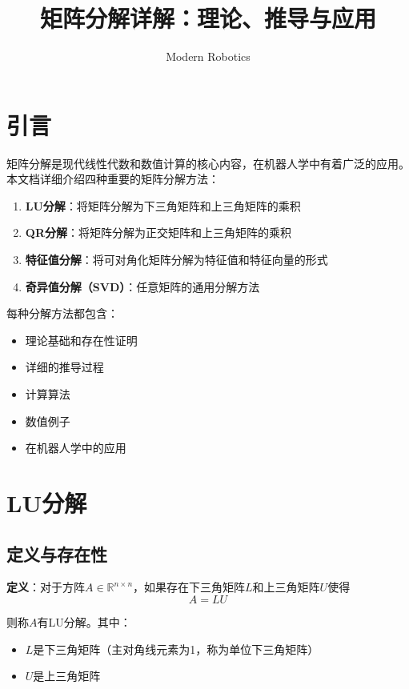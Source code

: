 \documentclass[12pt,a4paper]{article}
\title{矩阵分解详解：理论、推导与应用}
\author{Modern Robotics}
\date{}
\begin{document}
\maketitle

\tableofcontents
\newpage

\section{引言}

矩阵分解是现代线性代数和数值计算的核心内容，在机器人学中有着广泛的应用。本文档详细介绍四种重要的矩阵分解方法：

\begin{enumerate}
\item \textbf{LU分解}：将矩阵分解为下三角矩阵和上三角矩阵的乘积
\item \textbf{QR分解}：将矩阵分解为正交矩阵和上三角矩阵的乘积
\item \textbf{特征值分解}：将可对角化矩阵分解为特征值和特征向量的形式
\item \textbf{奇异值分解（SVD）}：任意矩阵的通用分解方法
\end{enumerate}

每种分解方法都包含：
\begin{itemize}
\item 理论基础和存在性证明
\item 详细的推导过程
\item 计算算法
\item 数值例子
\item 在机器人学中的应用
\end{itemize}

\section{LU分解}

\subsection{定义与存在性}

\textbf{定义}：对于方阵$A \in \mathbb{R}^{n \times n}$，如果存在下三角矩阵$L$和上三角矩阵$U$使得
\begin{equation}
A = LU
\label{eq:lu_decomp}
\end{equation}

则称$A$有LU分解。其中：
\begin{itemize}
\item $L$是下三角矩阵（主对角线元素为1，称为单位下三角矩阵）
\item $U$是上三角矩阵
\end{itemize}
\end{document}
